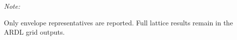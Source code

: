 \begin{table}[!h]
\begin{threeparttable}
\begin{tabular}[t]{llrrrrllllrrrlllrrrrlrrrrrrrrlrllllllrllrrrrllllrrrlllrrlrrrrrrrrlrlll}
\bottomrule
\end{tabular}
\begin{tablenotes}
\item \textit{Note: } 
\item Only envelope representatives are reported. Full lattice results remain in the ARDL grid outputs.
\end{tablenotes}
\end{threeparttable}
\end{table}
